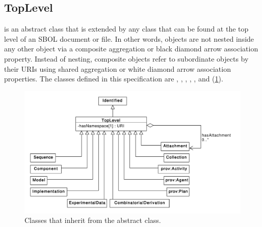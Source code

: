 

\subsection {TopLevel}
\label{sec:TopLevel}
 is an abstract class that is extended by any  class that can be found at the top level of an SBOL document or file. In other words,  objects are not nested inside any other object via a composite aggregation or black diamond arrow association property. Instead of nesting, composite  objects refer to subordinate  objects by their URIs using shared aggregation or white diamond arrow association properties. The  classes defined in this specification are , , , ,  , and  (\ref{uml:toplevel}).

\begin{figure}[ht]
\begin{center}
\includegraphics[width=\textwidth]{uml/toplevel}
\caption[]{Classes that inherit from the  abstract class.}
\label{uml:toplevel}
\end{center}
\end{figure}

